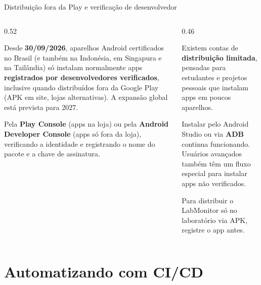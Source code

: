 \documentclass[aspectratio=169,10pt]{beamer}
\begin{document}
\begin{frame}{Distribuição fora da Play e verificação de desenvolvedor}
  \begin{columns}[T]
    \begin{column}{0.52\textwidth}
      \begin{atencao}
        Desde \textbf{30/09/2026}, aparelhos Android certificados no Brasil (e também na Indonésia, em Singapura e na Tailândia) só instalam normalmente apps \textbf{registrados por desenvolvedores verificados}, inclusive quando distribuídos fora da Google Play (APK em site, lojas alternativas). A expansão global está prevista para 2027.
      \end{atencao}
      \begin{conceito}
        Pela \textbf{Play Console} (apps na loja) ou pela \textbf{Android Developer Console} (apps só fora da loja), verificando a identidade e registrando o nome do pacote e a chave de assinatura.
      \end{conceito}
    \end{column}
    \begin{column}{0.46\textwidth}
      \begin{dica}
        Existem contas de \textbf{distribuição limitada}, pensadas para estudantes e projetos pessoais que instalam apps em poucos aparelhos.
      \end{dica}
      \begin{conceito}
        Instalar pelo Android Studio ou via \textbf{ADB} continua funcionando. Usuários avançados também têm um fluxo especial para instalar apps não verificados.
      \end{conceito}
      \begin{dica}
        Para distribuir o LabMonitor só no laboratório via APK, registre o app antes.
      \end{dica}
    \end{column}
  \end{columns}
\end{frame}

\section{Automatizando com CI/CD}
\end{document}
